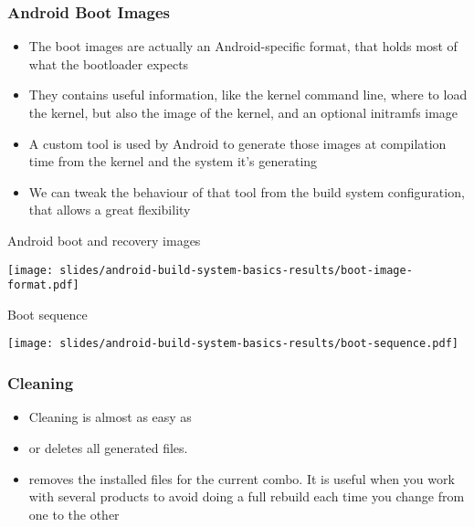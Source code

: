 \begin{frame}
  \frametitle{Android Boot Images}
  \begin{itemize}
  \item The boot images are actually an Android-specific format, that
    holds most of what the bootloader expects
  \item They contains useful information, like the kernel command
    line, where to load the kernel, but also the image of the kernel,
    and an optional initramfs image
  \item A custom  tool is used by Android to generate
    those images at compilation time from the kernel and the system
    it's generating
  \item We can tweak the behaviour of that tool from the build system
    configuration, that allows a great flexibility
  \end{itemize}
\end{frame}

\begin{frame}{Android boot and recovery images}
  \begin{center}
  \texttt{[image: slides/android-build-system-basics-results/boot-image-format.pdf]}
  \end{center}
\end{frame}

\begin{frame}{Boot sequence}
  \begin{center}
  \texttt{[image: slides/android-build-system-basics-results/boot-sequence.pdf]}
  \end{center}
\end{frame}

\begin{frame}
  \frametitle{Cleaning}
  \begin{itemize}
  \item Cleaning is almost as easy as 
  \item {} or  deletes all generated
    files.
  \item {} removes the installed files for the
    current combo. It is useful when you work with several products to
    avoid doing a full rebuild each time you change from one to the
    other
  \end{itemize}
\end{frame}
